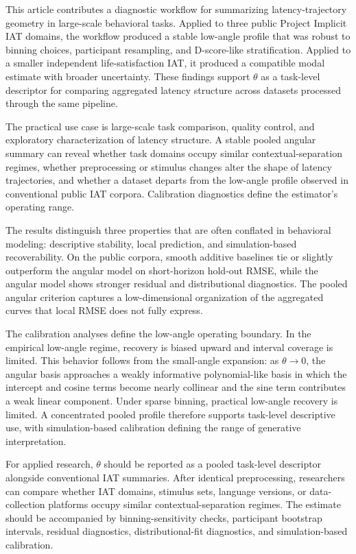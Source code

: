 \documentclass[12pt]{article}
\begin{document}
This article contributes a diagnostic workflow for summarizing latency-trajectory geometry in large-scale behavioral tasks. Applied to three public Project Implicit IAT domains, the workflow produced a stable low-angle profile that was robust to binning choices, participant resampling, and D-score-like stratification. Applied to a smaller independent life-satisfaction IAT, it produced a compatible modal estimate with broader uncertainty. These findings support \(\theta\) as a task-level descriptor for comparing aggregated latency structure across datasets processed through the same pipeline.

The practical use case is large-scale task comparison, quality control, and exploratory characterization of latency structure. A stable pooled angular summary can reveal whether task domains occupy similar contextual-separation regimes, whether preprocessing or stimulus changes alter the shape of latency trajectories, and whether a dataset departs from the low-angle profile observed in conventional public IAT corpora. Calibration diagnostics define the estimator's operating range.

The results distinguish three properties that are often conflated in behavioral modeling: descriptive stability, local prediction, and simulation-based recoverability. On the public corpora, smooth additive baselines tie or slightly outperform the angular model on short-horizon hold-out RMSE, while the angular model shows stronger residual and distributional diagnostics. The pooled angular criterion captures a low-dimensional organization of the aggregated curves that local RMSE does not fully express.

The calibration analyses define the low-angle operating boundary. In the empirical low-angle regime, recovery is biased upward and interval coverage is limited. This behavior follows from the small-angle expansion: as \(\theta \to 0\), the angular basis approaches a weakly informative polynomial-like basis in which the intercept and cosine terms become nearly collinear and the sine term contributes a weak linear component. Under sparse binning, practical low-angle recovery is limited. A concentrated pooled profile therefore supports task-level descriptive use, with simulation-based calibration defining the range of generative interpretation.

For applied research, \(\theta\) should be reported as a pooled task-level descriptor alongside conventional IAT summaries. After identical preprocessing, researchers can compare whether IAT domains, stimulus sets, language versions, or data-collection platforms occupy similar contextual-separation regimes. The estimate should be accompanied by binning-sensitivity checks, participant bootstrap intervals, residual diagnostics, distributional-fit diagnostics, and simulation-based calibration.
\end{document}
